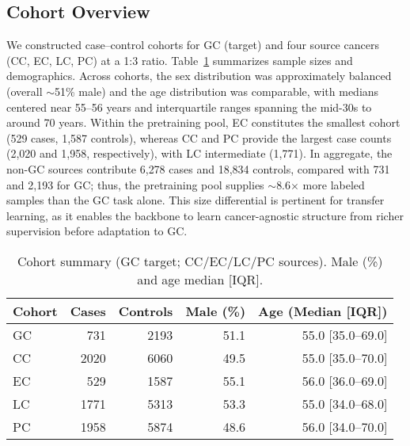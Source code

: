 \documentclass[diagnostics,article,submit,pdftex,moreauthors]{Definitions/mdpi}
\begin{document}
\subsection{Cohort Overview}
We constructed case--control cohorts for GC (target) and four source cancers (CC, EC, LC, PC) at a 1:3 ratio.
Table~\ref{tab:cohort} summarizes sample sizes and demographics.
Across cohorts, the sex distribution was approximately balanced (overall $\sim$51\% male) and the age distribution was comparable, with medians centered near 55--56 years and interquartile ranges spanning the mid-30s to around 70 years. 
Within the pretraining pool, EC constitutes the smallest cohort (529 cases, 1{,}587 controls), whereas CC and PC provide the largest case counts (2{,}020 and 1{,}958, respectively), with LC intermediate (1{,}771). 
In aggregate, the non-GC sources contribute 6{,}278 cases and 18{,}834 controls, compared with 731 and 2{,}193 for GC; thus, the pretraining pool supplies $\sim$8.6$\times$ more labeled samples than the GC task alone. 
This size differential is pertinent for transfer learning, as it enables the backbone to learn cancer-agnostic structure from richer supervision before adaptation to GC.
\begin{table}[H]
\caption{Cohort summary (GC target; CC/EC/LC/PC sources). Male (\%) and age median [IQR].\label{tab:cohort}}
\centering
\begin{tabular}{lrrrr}
\toprule
Cohort & Cases & Controls & Male (\%) & Age (Median [IQR]) \\
\midrule
GC & 731 & 2193 & 51.1 & 55.0 [35.0–69.0] \\
CC & 2020 & 6060 & 49.5 & 55.0 [35.0–70.0] \\
EC & 529 & 1587 & 55.1 & 56.0 [36.0–69.0] \\
LC & 1771 & 5313 & 53.3 & 55.0 [34.0–68.0] \\
PC & 1958 & 5874 & 48.6 & 56.0 [34.0–70.0] \\
\bottomrule
\end{tabular}
\end{table}
\end{document}
